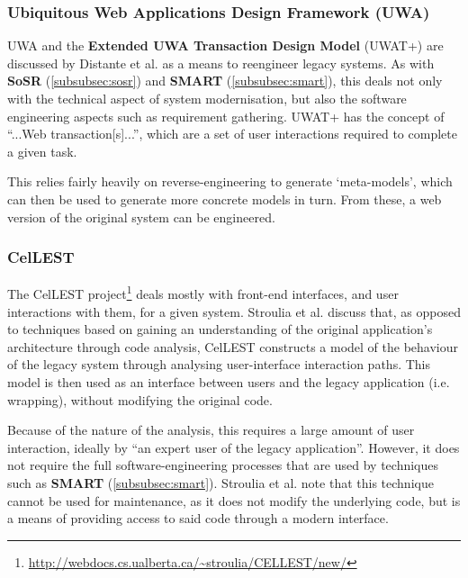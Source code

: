 \documentclass[12pt,journal,compsoc]{IEEEtran}
\begin{document}
\subsubsection{Ubiquitous Web Applications Design Framework (UWA)}
\label{subsubsec:uwa}
UWA\cite{UWAConsortium2002} and the \textbf{Extended UWA Transaction Design Model} (UWAT+)\cite{Distante2005} are discussed by Distante et al.\cite{Distante2006} as a means to reengineer legacy systems. As with \textbf{SoSR} (\autoref{subsubsec:sosr}) and \textbf{SMART} (\autoref{subsubsec:smart}), this deals not only with the technical aspect of system modernisation, but also the software engineering aspects such as requirement gathering. UWAT+ has the concept of ``...Web transaction[s]...''\cite{Distante2006}, which are a set of user interactions required to complete a given task.

This relies fairly heavily on reverse-engineering to generate `meta-models', which can then be used to generate more concrete models in turn. From these, a web version of the original system can be engineered.

\subsubsection{CelLEST}
\label{subsubsec:cellest}
The CelLEST project\footnote{\url{http://webdocs.cs.ualberta.ca/~stroulia/CELLEST/new/}} deals mostly with front-end interfaces, and user interactions with them, for a given system. Stroulia et al.\cite{Stroulia2002} discuss that, as opposed to techniques based on gaining an understanding of the original application's architecture through code analysis, CelLEST constructs a model of the behaviour of the legacy system through analysing user-interface interaction paths. This model is then used as an interface between users and the legacy application (i.e. wrapping), without modifying the original code.

Because of the nature of the analysis, this requires a large amount of user interaction, ideally by ``an expert user of the legacy application''\cite{Stroulia2002}. However, it does not require the full software-engineering processes that are used by techniques such as \textbf{SMART} (\autoref{subsubsec:smart}). Stroulia et al. note that this technique cannot be used for maintenance, as it does not modify the underlying code, but is a means of providing access to said code through a modern interface.
\end{document}

